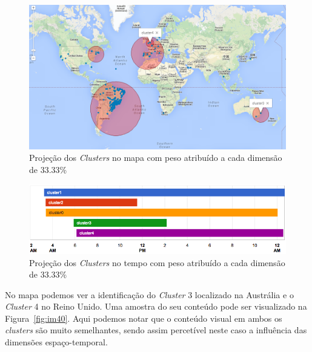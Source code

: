 \begin{figure}[!h]
\centering
\includegraphics[width=1\linewidth]{./figures/olhopassarinho/map_ex1_im33_e33_t33_1819}
\caption{Projeção dos \textit{Clusters} no mapa com peso atribuído a cada dimensão de 33.33\%}
\label{fig:map4}
\end{figure}

\begin{figure}[h]
\centering
\includegraphics[width=1\linewidth]{./figures/olhopassarinho/temp_ex1_im33_e33_t33_1819}
\caption{Projeção dos \textit{Clusters} no tempo com peso atribuído a cada dimensão de 33.33\%}
\label{fig:temp4}
\end{figure}

No mapa podemos ver a identificação do \textit{Cluster} 3 localizado na Austrália e o \textit{Cluster} 4 no Reino Unido. Uma amostra do seu conteúdo pode ser visualizado na Figura~\ref{fig:im40}. Aqui podemos notar que o conteúdo visual em ambos os \textit{clusters} são muito semelhantes, sendo assim percetível neste caso a influência das dimensões espaço-temporal. 

